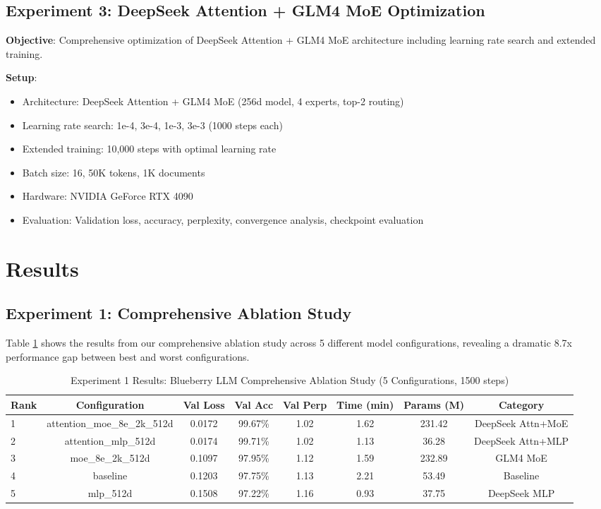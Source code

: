 \documentclass[11pt,a4paper]{article}
\begin{document}
\subsection{Experiment 3: DeepSeek Attention + GLM4 MoE Optimization}

\textbf{Objective}: Comprehensive optimization of DeepSeek Attention + GLM4 MoE architecture including learning rate search and extended training.

\textbf{Setup}:
\begin{itemize}
    \item Architecture: DeepSeek Attention + GLM4 MoE (256d model, 4 experts, top-2 routing)
    \item Learning rate search: 1e-4, 3e-4, 1e-3, 3e-3 (1000 steps each)
    \item Extended training: 10,000 steps with optimal learning rate
    \item Batch size: 16, 50K tokens, 1K documents
    \item Hardware: NVIDIA GeForce RTX 4090
    \item Evaluation: Validation loss, accuracy, perplexity, convergence analysis, checkpoint evaluation
\end{itemize}


\section{Results}

\subsection{Experiment 1: Comprehensive Ablation Study}

Table \ref{tab:exp1_results} shows the results from our comprehensive ablation study across 5 different model configurations, revealing a dramatic 8.7x performance gap between best and worst configurations.

\begin{table}[H]
\centering
\caption{Experiment 1 Results: Blueberry LLM Comprehensive Ablation Study (5 Configurations, 1500 steps)}
\label{tab:exp1_results}
\begin{tabular}{@{}lccccccc@{}}
\toprule
Rank & Configuration & Val Loss & Val Acc & Val Perp & Time (min) & Params (M) & Category \\
\midrule
1 & attention\_moe\_8e\_2k\_512d & 0.0172 & 99.67\% & 1.02 & 1.62 & 231.42 & DeepSeek Attn+MoE \\
2 & attention\_mlp\_512d & 0.0174 & 99.71\% & 1.02 & 1.13 & 36.28 & DeepSeek Attn+MLP \\
3 & moe\_8e\_2k\_512d & 0.1097 & 97.95\% & 1.12 & 1.59 & 232.89 & GLM4 MoE \\
4 & baseline & 0.1203 & 97.75\% & 1.13 & 2.21 & 53.49 & Baseline \\
5 & mlp\_512d & 0.1508 & 97.22\% & 1.16 & 0.93 & 37.75 & DeepSeek MLP \\
\bottomrule
\end{tabular}
\end{table}
\end{document}
